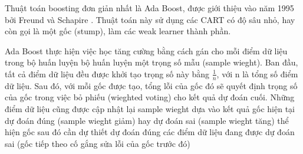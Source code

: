         Thuật toán boosting đơn giản nhất là Ada Boost, được giới thiệu vào năm 1995 bởi Freund và Schapire \cite{freund1997decision}.
        Thuật toán này sử dụng các CART có độ sâu nhỏ, hay còn gọi là một gốc (stump), làm các weak learner thành phần. 
        
        Ada Boost thực hiện việc học tăng cường bằng cách gán cho mỗi điểm dữ liệu trong bộ huấn luyện bộ huấn luyện một trọng số mẫu (sample wieght). Ban đầu, tất cả điểm dữ liệu đều được khởi tạo trọng số này bằng $\frac{1}{n}$, với n là tổng số điểm dữ liệu. Sau đó, với mỗi gốc được tạo, tổng lỗi của gốc đó sẽ quyết định trọng số của gốc trong việc bỏ phiếu (wieghted voting) cho kết quả dự đoán cuối. Những điểm dữ liệu cũng được cập nhật lại sample wieght dựa vào kết quả gốc hiện tại dự đoán đúng (sample wieght giảm) hay dự đoán sai (sample wieght tăng) thể hiện gốc sau đó cần dự thiết dự đoán đúng các điểm dữ liệu đang được dự đoán sai (gốc tiếp theo cố gắng sửa lỗi của gốc trước đó)
        
